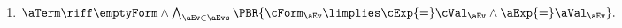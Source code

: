 \begin{definition}
\begin{multicols}{2}
\begin{enumerate}[topsep=0pt,label=(\textsc{w}\arabic*),ref=\textsc{w}\arabic*]
    \item \label {write-term-ca-addr}
      \begin{math}
        \aTerm \riff
        \emptyForm
        \land
        \bigwedge_{\aEv\in\aEvs}\PBR{\cForm_\aEv \limplies \cExp{=}\cVal_\aEv \land\aExp{=}\aVal_\aEv}.
      \end{math}
    \end{enumerate}
  \end{multicols}


\end{definition}
